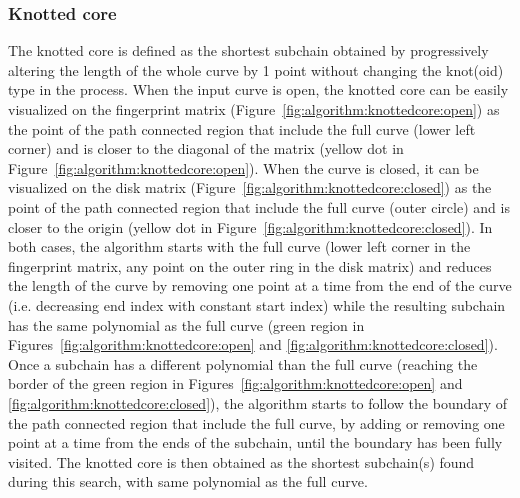 \subsubsection{\label{sec:algorithms:knottedcore}Knotted core}
The knotted core is defined as the shortest subchain obtained by progressively altering the length of the whole curve by 1 point without changing the knot(oid) type in the process.
When the input curve is open, the knotted core can be easily visualized on the fingerprint matrix (Figure~\ref{fig:algorithm:knottedcore:open}) as the point of the path connected region that include the full curve (lower left corner) and is closer to the diagonal of the matrix (yellow dot in Figure~\ref{fig:algorithm:knottedcore:open}). When the curve is closed, it can be visualized on the disk matrix (Figure~\ref{fig:algorithm:knottedcore:closed}) as the point of the path connected region that include the full curve (outer circle) and is closer to the origin (yellow dot in Figure~\ref{fig:algorithm:knottedcore:closed}). In both cases, the algorithm starts with the full curve (lower left corner in the fingerprint matrix, any point on the outer ring in the disk matrix) and reduces the length of the curve by removing one point at a time from the end of the curve (i.e. decreasing end index with constant start index) while  the resulting subchain has the same polynomial as the full curve (green region in Figures~\ref{fig:algorithm:knottedcore:open} and \ref{fig:algorithm:knottedcore:closed}). Once a subchain has a different polynomial than the full curve (reaching the border of the green region in Figures~\ref{fig:algorithm:knottedcore:open} and \ref{fig:algorithm:knottedcore:closed}), the algorithm starts to follow the boundary of the path connected region that include the full curve, by adding or removing one point at a time from the ends of the subchain, until the boundary has been fully visited. The knotted core is then obtained as the shortest subchain(s) found during this search, with same polynomial as the full curve.

